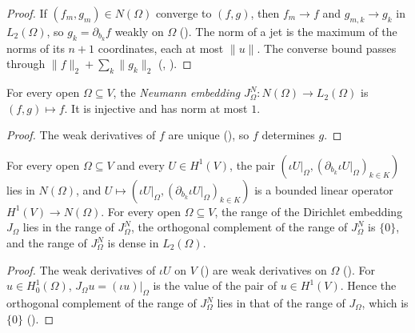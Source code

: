 \begin{proof}
\leanok
If $(f_m, g_m) \in N(\Omega)$ converge to $(f, g)$, then $f_m \to f$ and $g_{m,k} \to g_k$ in
$L_2(\Omega)$, so $g_k = \partial_{b_k} f$ weakly on $\Omega$
(). The norm of a jet is the maximum of the norms of its
$n + 1$ coordinates, each at most $\|u\|$. The converse bound passes through
$\|f\|_2 + \sum_k \|g_k\|_2$ (, ).
\end{proof}

\begin{definition}
\label{def:neumann-embedding}
\leanok
{}
For every open $\Omega \subseteq V$, the \emph{Neumann embedding}
$J^N_\Omega : N(\Omega) \to L_2(\Omega)$ is $(f, g) \mapsto f$. It is injective and has norm at
most $1$.
\end{definition}

\begin{proof}
\leanok
The weak derivatives of $f$ are unique (), so $f$ determines
$g$.
\end{proof}

\begin{lemma}
\label{lem:neumann-dense}
\leanok
{}
For every open $\Omega \subseteq V$ and every $U \in H^1(V)$, the pair
$(\iota U|_\Omega, (\partial_{b_k} \iota U|_\Omega)_{k \in K})$ lies in $N(\Omega)$, and
$U \mapsto (\iota U|_\Omega, (\partial_{b_k} \iota U|_\Omega)_{k \in K})$ is a bounded linear
operator $H^1(V) \to N(\Omega)$. For every open $\Omega \subseteq V$, the range of the Dirichlet
embedding $J_\Omega$ lies in the range of $J^N_\Omega$, the orthogonal complement of the range of
$J^N_\Omega$ is $\{0\}$, and the range of $J^N_\Omega$ is dense in $L_2(\Omega)$.
\end{lemma}

\begin{proof}
\leanok
The weak derivatives of $\iota U$ on $V$ () are
weak derivatives on $\Omega$ (). For $u \in H^1_0(\Omega)$,
$J_\Omega u = (\iota u)|_\Omega$ is the value of the pair of $u \in H^1(V)$. Hence the
orthogonal complement of the range of $J^N_\Omega$ lies in that of the range of $J_\Omega$, which
is $\{0\}$ ().
\end{proof}

